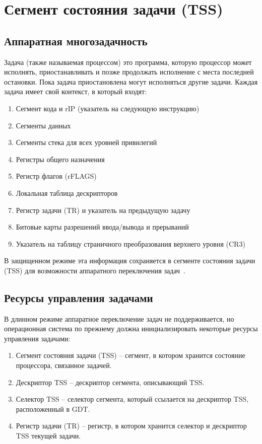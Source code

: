 \section{Сегмент состояния задачи (TSS)}
\subsection{Аппаратная многозадачность}
Задача (также называемая процессом) это программа, которую процессор может
исполнять, приостанавливать и позже продолжать исполнение с места последней
остановки. Пока задача приостановлена могут исполняться другие задачи. Каждая
задача имеет свой контекст, в который входят:
\begin{enumerate}[1.]
\item Сегмент кода и rIP (указатель на следующую инструкцию)
\item Сегменты данных
\item Сегменты стека для всех уровней привилегий
\item Регистры общего назначения
\item Регистр флагов (rFLAGS)
\item Локальная таблица дескрипторов
\item Регистр задачи (TR) и указатель на предыдущую задачу
\item Битовые карты разрешений ввода/вывода и прерываний
\item Указатель на таблицу страничного преобразования верхнего уровня (CR3)
\end{enumerate}

В защищенном режиме эта информация сохраняется в сегменте состояния задачи (TSS)
для возможности аппаратного переключения задач~\cite[стр. 327]{amd_pm_v2}.

\subsection{Ресурсы управления задачами}
В длинном режиме аппаратное переключение задач не поддерживается, но
операционная система по прежнему должна инициализировать некоторые ресурсы
управления задачами:
\begin{enumerate}[1.]
\item Сегмент состояния задачи (TSS) -- сегмент, в котором хранится состояние
	процессора, связанное задачей.
\item Дескриптор TSS -- дескриптор сегмента, описывающий TSS.
\item Селектор TSS -- селектор сегмента, который ссылается на дескриптор TSS,
	расположенный в GDT.
\item Регистр задачи (TR) -- регистр, в котором хранится селектор и дескриптор
	TSS текущей задачи.
\end{enumerate}

